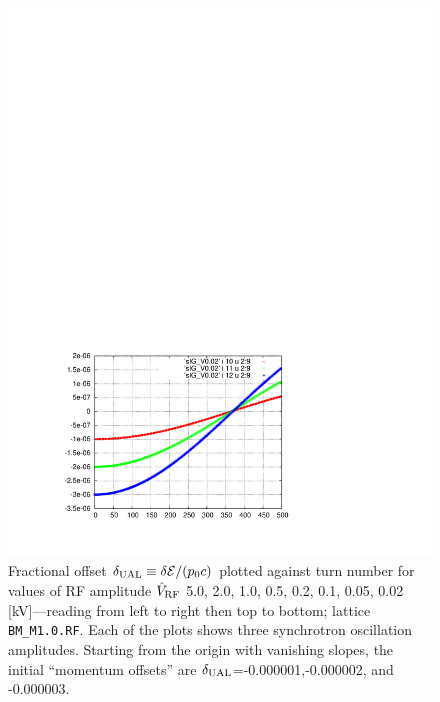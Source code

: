 \documentclass[]{article}
\begin{document}
\begin{figure}[h]
\begin{minipage}[b]{0.45\linewidth}
\includegraphics[scale=0.55]{pdf/delta_vs_turn_V0p02.pdf}
\end{minipage}
%
\caption{\label{fig:delta_vs_turn_V}Fractional offset 
$\delta_{\rm UAL}\equiv\delta{\mathcal{E}}/(p_0c)$ 
plotted against turn number for
values of RF amplitude $\hat V_{\rm RF}$
5.0, 2.0, 1.0, 0.5, 0.2, 0.1, 0.05, 0.02 [kV]---reading from
left to right then top to bottom; lattice {\tt BM\_M1.0.RF}.
Each of the plots shows three synchrotron oscillation 
amplitudes. Starting from the origin with vanishing slopes, the
initial ``momentum offsets'' are 
$\delta_{\rm UAL}$=-0.000001,-0.000002, and -0.000003.
}
\end{figure}
%
\end{document}
